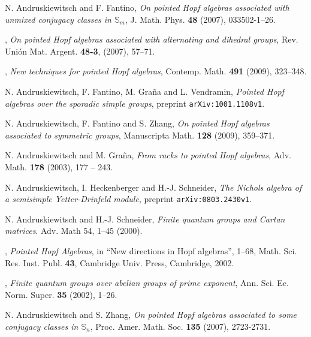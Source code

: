 \documentclass[11pt]{amsart} \textheight 22cm
\renewcommand{\^}[1]{\mbox{$^{\left( #1 \right)}$}}
\renewcommand{\_}[1]{\mbox{$_{\left( #1 \right)}$}}
\theoremstyle{plain}
\theoremstyle{definition}
\theoremstyle{remark}
\newcommand\s{\mathbb S}
\theoremstyle{remark}
\begin{document}
\begin{thebibliography}{AFGV}%


 N. Andruskiewitsch and F. Fantino, \emph{On pointed Hopf algebras associated with unmixed conjugacy classes
 in $\s_m$}, J. Math. Phys. \textbf{48} (2007), 033502-1--26.

 \bysame,
    \emph{On pointed Hopf algebras associated with alternating and
    dihedral groups}, Rev. Uni\'on Mat. Argent. \textbf{48-3}, (2007), 57--71.

 \bysame, \emph {New techniques for pointed Hopf algebras},
Contemp. Math. \textbf{491} (2009), 323--348.




  N. Andruskiewitsch, F. Fantino, M. Gra\~na
and L. Vendramin, \emph{Pointed Hopf algebras over the sporadic
simple groups}, preprint \texttt{arXiv:1001.1108v1}.




 N. Andruskiewitsch,  F. Fantino and   S. Zhang,
    \emph{On pointed Hopf algebras associated to symmetric groups},
  Manuscripta Math. \textbf{128} (2009), 359--371.

 N. Andruskiewitsch and M. Gra\~na,
    \emph{From racks to pointed Hopf algebras}, Adv. Math.
    \textbf{178}  (2003), 177 -- 243.

 N. Andruskiewitsch, I. Heckenberger and H.-J. Schneider,
\emph{The Nichols algebra of a semisimple Yetter-Drinfeld module}, preprint
\texttt{arXiv:0803.2430v1}.


  N. Andruskiewitsch and  H.-J. Schneider, \emph{Finite quantum
groups and Cartan matrices}.  Adv. Math 54, 1--45 (2000).

 \bysame,
    \emph{Pointed Hopf Algebras}, in ``New directions in Hopf algebras'',
    1--68, Math. Sci. Res. Inst. Publ. \textbf{43}, Cambridge Univ. Press,
    Cambridge, 2002.

\bysame, \emph{Finite quantum groups over abelian groups of prime
exponent}, Ann. Sci. Ec. Norm. Super. \textbf{35} (2002), 1--26.


 N. Andruskiewitsch and S. Zhang,
    \emph{On pointed Hopf algebras associated to some conjugacy classes in $\mathbb S_n$},
    Proc. Amer. Math. Soc. \textbf{135}  (2007), 2723-2731.


\end{thebibliography}
\end{document}
